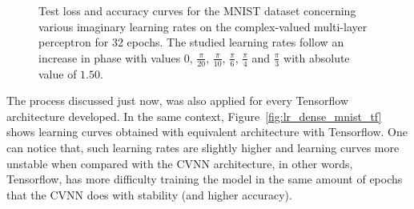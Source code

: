 \begin{figure}[htbp]
	\centering
	\caption{Test loss and accuracy curves for the MNIST dataset concerning various imaginary learning rates on the complex-valued multi-layer perceptron for 32 epochs. The studied learning rates follow an increase in phase with values $ 0 $, $ \frac{\pi}{20} $, $ \frac{\pi}{10} $, $ \frac{\pi}{6} $, $ \frac{\pi}{4} $ and $ \frac{\pi}{3} $ with absolute value of $ 1.50 $.}
	\label{fig:lr_im_dense_mnist}
\end{figure}

The process discussed just now, was also applied for every Tensorflow architecture developed. In the same context, Figure~\ref{fig:lr_dense_mnist_tf} shows learning curves obtained with equivalent architecture with Tensorflow. One can notice that, such  learning rates are slightly higher and learning curves more unstable when compared with the CVNN architecture, in other words, Tensorflow, has more difficulty training the model in the same amount of epochs that the CVNN does with stability (and higher accuracy).

